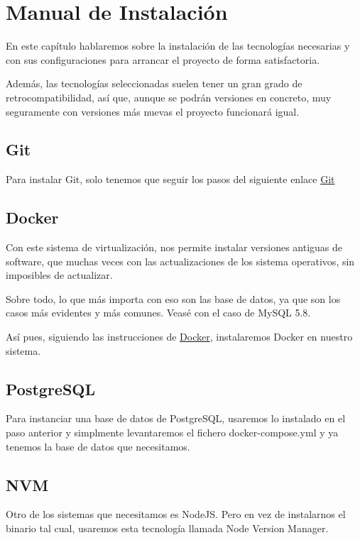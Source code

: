 \section{Manual de Instalación}

En este capítulo hablaremos sobre la instalación de las tecnologías necesarias y con sus configuraciones para arrancar el proyecto de forma satisfactoria.

Además, las tecnologías seleccionadas suelen tener un gran grado de retrocompatibilidad, así que, aunque se podrán versiones en concreto, muy seguramente con versiones más nuevas el proyecto funcionará igual.

\newpage

\subsection{Git}
Para instalar Git, solo tenemos que seguir los pasos del siguiente enlace \textcolor{blue}{\href{https://git-scm.com/book/en/v2/Getting-Started-Installing-Git}{Git}}

\subsection{Docker}
Con este sistema de virtualización, nos permite instalar versiones antiguas de software, que muchas veces con las actualizaciones de los sistema operativos, sin imposibles de actualizar.

Sobre todo, lo que más importa con eso son las base de datos, ya que son los casos más evidentes y más comunes. Veasé con el caso de MySQL 5.8.

Así pues, siguiendo las instrucciones de \textcolor{blue}{\href{https://docs.docker.com/engine/install}{Docker}}, instalaremos Docker en nuestro sistema.

\subsection{PostgreSQL}
Para instanciar una base de datos de PostgreSQL, usaremos lo instalado en el paso anterior y simplmente levantaremos el fichero docker-compose.yml y ya tenemos la base de datos que necesitamos.

\subsection{NVM}
Otro de los sistemas que necesitamos es NodeJS. Pero en vez de instalarnos el binario tal cual, usaremos esta tecnología llamada Node Version Manager.

